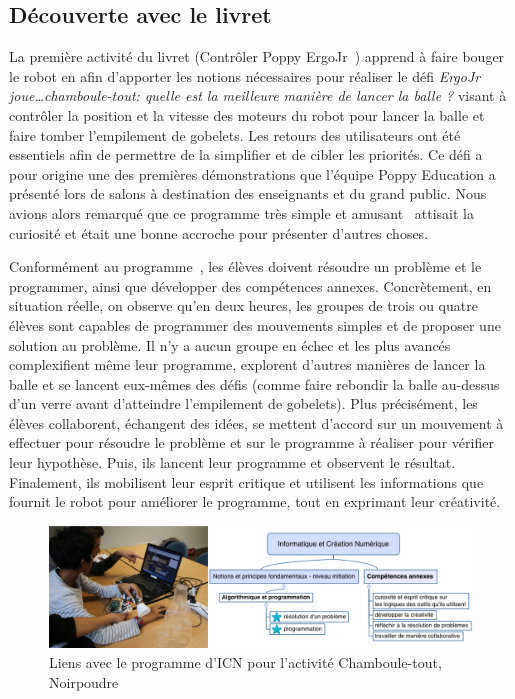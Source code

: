     \subsection{Découverte avec le livret}\label{sec:livret}
        La première activité du livret (Contrôler Poppy ErgoJr~) apprend à faire bouger le robot en  afin d'apporter les notions nécessaires pour réaliser le défi \textit{ErgoJr joue\dots chamboule-tout: quelle est la meilleure manière de lancer la balle ?} visant à contrôler la position et la vitesse des moteurs du robot pour lancer la balle et faire tomber l’empilement de gobelets. Les retours des utilisateurs ont été essentiels afin de permettre de la simplifier et de cibler les priorités. Ce défi a pour origine une des premières démonstrations que l'équipe Poppy Education a présenté lors de salons à destination des enseignants et du grand public. Nous avions alors remarqué que ce programme très simple et amusant~ attisait la curiosité et était une bonne accroche pour présenter d'autres choses.\par%
        Conformément au programme~, les élèves doivent résoudre un problème et le programmer, ainsi que développer des compétences annexes.
        Concrètement, en situation réelle, on observe qu'en deux heures, les groupes de trois ou quatre élèves sont capables de programmer des mouvements simples et de proposer une solution au problème. Il n'y a aucun groupe en échec et les plus avancés complexifient même leur programme, explorent d'autres manières de lancer la balle et se lancent eux-mêmes des défis (comme faire rebondir la balle au-dessus d'un verre avant d'atteindre l’empilement de gobelets). Plus précisément, les élèves collaborent, échangent des idées, se mettent d'accord sur un mouvement à effectuer pour résoudre le problème et sur le programme à réaliser pour vérifier leur hypothèse. Puis, ils lancent leur programme et observent le résultat. Finalement, ils mobilisent leur esprit critique et utilisent les informations que fournit le robot pour améliorer le programme, tout en exprimant leur créativité.
        \begin{figure}[!h]
            \centering
            \includegraphics[width=\linewidth]{Figures/Noirpoudre-chamboule-tout.png}
            \caption{Liens avec le programme d'ICN pour l'activité Chamboule-tout, Noirpoudre~\cite{RI}}\label{fig:Chamboule_tout}
        \end{figure}\par%
